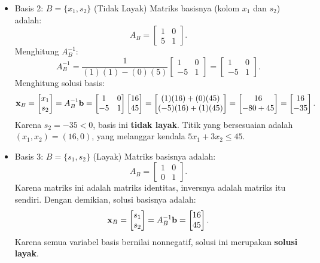 \begin{itemize}
\item  Basis 2: \(B= \{x_1, s_2\} \) (Tidak Layak)
Matriks basisnya (kolom \( x_1 \) dan \( s_2 \)) adalah:
\[
A_B =
\begin{bmatrix}
    1 & 0 \\
    5 & 1
\end{bmatrix}.
\]
Menghitung \( A_B^{-1} \):
\[
A_B^{-1} =
\frac{1}{(1)(1) - (0)(5)}
\begin{bmatrix}
    1 & 0 \\
    -5 & 1
\end{bmatrix}
=
\begin{bmatrix}
    1 & 0 \\
    -5 & 1
\end{bmatrix}.
\]
Menghitung solusi basis:
\[
\mathbf{x}_B = \begin{bmatrix} x_1 \\ s_2 \end{bmatrix} = A_B^{-1}\mathbf{b}=
\begin{bmatrix}
    1 & 0 \\
    -5 & 1
\end{bmatrix}
\begin{bmatrix}
    16 \\ 45
\end{bmatrix}
=
\begin{bmatrix}
    (1)(16) + (0)(45) \\
    (-5)(16) + (1)(45)
\end{bmatrix}
=
\begin{bmatrix}
    16 \\
    -80 + 45
\end{bmatrix}
=
\begin{bmatrix}
    16 \\ -35
\end{bmatrix}.
\]
Karena \( s_2 = -35 < 0 \), basis ini \textbf{tidak layak}.  Titik yang bersesuaian adalah \( (x_1, x_2) = (16, 0) \), yang melanggar kendala \( 5x_1 + 3x_2 \leq 45 \).

\item  Basis 3: \(B= \{s_1, s_2\} \) (Layak)
Matriks basisnya adalah:
\[
A_B =
\begin{bmatrix}
    1 & 0 \\
    0 & 1
\end{bmatrix}.
\]
Karena matriks ini adalah matriks identitas, inversnya adalah matriks itu sendiri. Dengan demikian, solusi basisnya adalah:
\[
\mathbf{x}_B = \begin{bmatrix} s_1 \\ s_2 \end{bmatrix} = A_B^{-1}\mathbf{b}=
\begin{bmatrix}
    16 \\ 45
\end{bmatrix}.
\]
Karena semua variabel basis bernilai nonnegatif, solusi ini merupakan \textbf{solusi layak}.
\end{itemize}

